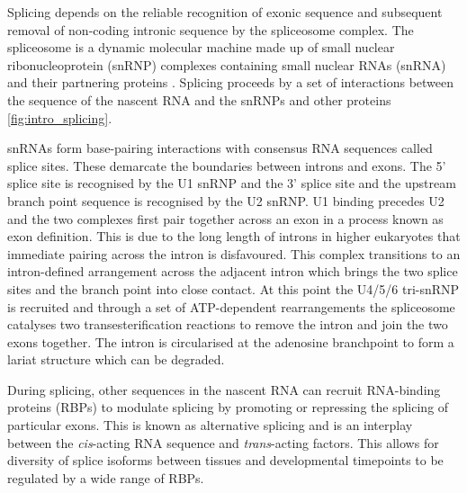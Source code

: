 Splicing depends on the reliable recognition of exonic sequence and subsequent removal of non-coding intronic sequence by the spliceosome complex. 
The spliceosome is a dynamic molecular machine made up of small nuclear ribonucleoprotein (snRNP) complexes containing small nuclear RNAs (snRNA) and their partnering proteins \citep{Matera2014}. 
Splicing proceeds by a set of interactions between the sequence of the nascent RNA and the snRNPs and other proteins \ref{fig:intro_splicing}.

snRNAs form base-pairing interactions with consensus RNA sequences called splice sites. 
These demarcate the boundaries between introns and exons. 
The 5' splice site is recognised by the U1 snRNP and the 3' splice site and the upstream branch point sequence is recognised by the U2 snRNP.
U1 binding precedes U2 and the two complexes first pair together across an exon in a process known as exon definition. 
This is due to the long length of introns in higher eukaryotes that immediate pairing across the intron is disfavoured.
This complex transitions to an intron-defined arrangement across the adjacent intron which brings the two splice sites and the branch point into close contact.
At this point the U4/5/6 tri-snRNP is recruited and through a set of ATP-dependent rearrangements the spliceosome catalyses two transesterification reactions to remove the intron and join the two exons together.
The intron is circularised at the adenosine branchpoint to form a lariat structure which can be degraded.

During splicing, other sequences in the nascent RNA can recruit RNA-binding proteins (RBPs) to modulate splicing by promoting or repressing the splicing of particular exons.
This is known as alternative splicing and is an interplay between the \textit{cis}-acting RNA sequence and \textit{trans}-acting factors.
This allows for diversity of splice isoforms between tissues and developmental timepoints to be regulated by a wide range of RBPs.

